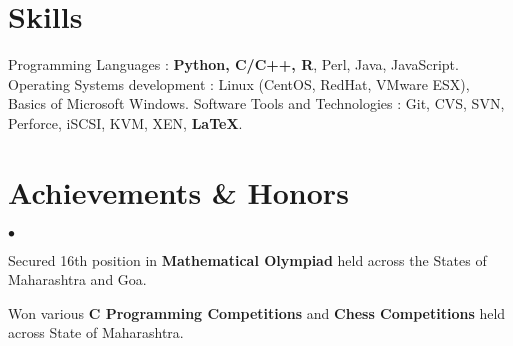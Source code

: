 \documentclass[margin,line]{res}
\newenvironment{list2}{
  \begin{list}{$\bullet$}{%
      \setlength{\itemsep}{0.05in}
      \setlength{\parsep}{0in} \setlength{\parskip}{0in}
      \setlength{\topsep}{-0.1in} \setlength{\partopsep}{0in}
      \setlength{\leftmargin}{0.2in}}}{\end{list}}
\begin{document}
\begin{resume}
%
%

\section{\sc Skills}
Programming Languages : {\bf Python, C/C++, R}, Perl, Java, JavaScript. \newline
Operating Systems development : Linux (CentOS, RedHat, VMware ESX), Basics of Microsoft Windows. \newline
Software Tools and Technologies : Git, CVS, SVN, Perforce, iSCSI, KVM, XEN, {\bf \LaTeX}.

\section{\sc Achievements \& Honors}
\begin{list2}
\item Secured 16th position in {\bf Mathematical Olympiad} held across the States of Maharashtra and Goa.
\item Won various {\bf C Programming Competitions} and {\bf Chess Competitions} held across State of Maharashtra.
\end{list2}



\end{resume}
\end{document}
